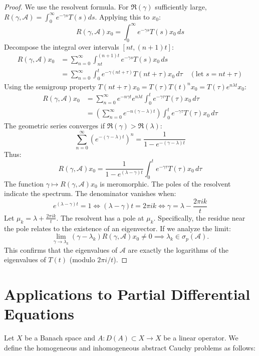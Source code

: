 \documentclass[12pt, oneside]{book}
\newcommand{\A}{\mathscr{A}}
\begin{document}
\begin{proof}
We use the resolvent formula. For $\Re(\gamma)$ sufficiently large, $R(\gamma, \A) = \int_0^\infty e^{-\gamma s} T(s) ds$. Applying this to $x_0$:
$$
R(\gamma, \A)x_0 = \int_0^\infty e^{-\gamma s} T(s) x_0 \, ds
$$
Decompose the integral over intervals $[nt, (n+1)t]$:
\begin{align*}
R(\gamma, \A)x_0 &= \sum_{n=0}^\infty \int_{nt}^{(n+1)t} e^{-\gamma s} T(s) x_0 \, ds \\
&= \sum_{n=0}^\infty \int_0^t e^{-\gamma(nt + \tau)} T(nt + \tau) x_0 \, d\tau \quad (\text{let } s = nt + \tau)
\end{align*}
Using the semigroup property $T(nt+\tau)x_0 = T(\tau)T(t)^n x_0 = T(\tau) e^{n \lambda t} x_0$:
\begin{align*}
R(\gamma, \A)x_0 &= \sum_{n=0}^\infty e^{-n \gamma t} e^{n \lambda t} \int_0^t e^{-\gamma \tau} T(\tau) x_0 \, d\tau \\
&= \left( \sum_{n=0}^\infty e^{-n(\gamma - \lambda)t} \right) \int_0^t e^{-\gamma \tau} T(\tau) x_0 \, d\tau
\end{align*}
The geometric series converges if $\Re(\gamma) > \Re(\lambda)$:
$$
\sum_{n=0}^\infty (e^{-(\gamma - \lambda)t})^n = \frac{1}{1 - e^{-(\gamma - \lambda)t}}
$$
Thus:
$$
R(\gamma, \A)x_0 = \frac{1}{1 - e^{(\lambda - \gamma)t}} \int_0^t e^{-\gamma \tau} T(\tau) x_0 \, d\tau
$$
The function $\gamma \mapsto R(\gamma, \A)x_0$ is meromorphic. The poles of the resolvent indicate the spectrum. The denominator vanishes when:
$$
e^{(\lambda - \gamma)t} = 1 \iff (\lambda - \gamma)t = 2\pi i k \iff \gamma = \lambda - \frac{2\pi i k}{t}
$$
Let $\mu_k = \lambda + \frac{2\pi i k}{t}$. The resolvent has a pole at $\mu_k$.
Specifically, the residue near the pole relates to the existence of an eigenvector. If we analyze the limit:
$$
\lim_{\gamma \to \lambda_k} (\gamma - \lambda_k) R(\gamma, \A) x_0 \neq 0 \implies \lambda_k \in \sigma_p(\A).
$$
This confirms that the eigenvalues of $\A$ are exactly the logarithms of the eigenvalues of $T(t)$ (modulo $2\pi i / t$).
\end{proof}

\chapter{Applications to Partial Differential Equations}

Let $X$ be a Banach space and $A: D(A) \subset X \rightarrow X$ be a linear operator. We define the homogeneous and inhomogeneous abstract Cauchy problems as follows:
\end{document}
